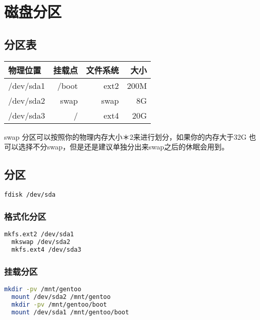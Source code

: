 
\chapter{磁盘分区}
\section{分区表}
\begin{tabular}{|l|r|r|r|}
  \hline
  物理位置 & 挂载点 & 文件系统 & 大小 \\
  \hline
  /dev/sda1 & /boot & ext2 & 200M \\
  \hline
  /dev/sda2 & swap & swap & 8G \\
  \hline
  /dev/sda3 & / & ext4 & 20G \\
  \hline
\end{tabular}

swap 分区可以按照你的物理内存大小＊2来进行划分，如果你的内存大于32G 也可以选择不分swap，但是还是建议单独分出来swap之后的休眠会用到。 
\section{分区}

\begin{lstlisting}[language=Bash]
  fdisk /dev/sda
\end{lstlisting}

\subsection{格式化分区}

\begin{lstlisting}[language=Bash]
  mkfs.ext2 /dev/sda1
  mkswap /dev/sda2
  mkfs.ext4 /dev/sda3 
\end{lstlisting}

\subsection{挂载分区}
\begin{lstlisting}[language=Bash]
  mkdir -pv /mnt/gentoo
  mount /dev/sda2 /mnt/gentoo
  mkdir -pv /mnt/gentoo/boot
  mount /dev/sda1 /mnt/gentoo/boot
\end{lstlisting}
